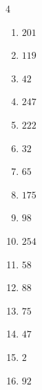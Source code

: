 \begin{multicols}{4}
\begin{enumerate}
  \item $201$


  \item $119$


  \item $42$


  \item $247$


  \item $222$


\columnbreak %

  \item $32$


  \item $65$


  \item $175$


  \item $98$


  \item $254$


  \item $58$


  \item $88$


  \item $75$


  \item $47$


  \item $2$


  \item $92$


\end{enumerate}
\end{multicols}
